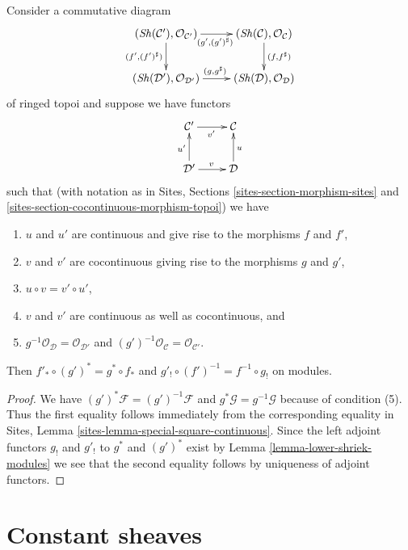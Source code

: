\begin{lemma}
\label{lemma-special-square-continuous}
Consider a commutative diagram
$$
\xymatrix{
(\Sh(\mathcal{C}'), \mathcal{O}_{\mathcal{C}'})
\ar[r]_{(g', (g')^\sharp)} \ar[d]_{(f', (f')^\sharp)} &
(\Sh(\mathcal{C}), \mathcal{O}_\mathcal{C}) \ar[d]^{(f, f^\sharp)} \\
(\Sh(\mathcal{D}'), \mathcal{O}_{\mathcal{D}'}) \ar[r]^{(g, g^\sharp)} &
(\Sh(\mathcal{D}), \mathcal{O}_\mathcal{D})
}
$$
of ringed topoi and suppose we have functors
$$
\xymatrix{
\mathcal{C}' \ar[r]_{v'} &
\mathcal{C} \\
\mathcal{D}' \ar[r]^v \ar[u]^{u'} &
\mathcal{D} \ar[u]_u
}
$$
such that (with notation as in
Sites, Sections \ref{sites-section-morphism-sites} and
\ref{sites-section-cocontinuous-morphism-topoi}) we have
\begin{enumerate}
\item $u$ and $u'$ are continuous and give rise to the morphisms
$f$ and $f'$,
\item $v$ and $v'$ are cocontinuous giving rise to the morphisms $g$ and $g'$,
\item $u \circ v = v' \circ u'$,
\item $v$ and $v'$ are continuous as well as cocontinuous, and
\item $g^{-1}\mathcal{O}_{\mathcal{D}} = \mathcal{O}_{\mathcal{D}'}$
and $(g')^{-1}\mathcal{O}_{\mathcal{C}} = \mathcal{O}_{\mathcal{C}'}$.
\end{enumerate}
Then $f'_* \circ (g')^* = g^* \circ f_*$ and
$g'_! \circ (f')^{-1} = f^{-1} \circ g_!$ on modules.
\end{lemma}

\begin{proof}
We have $(g')^*\mathcal{F} = (g')^{-1}\mathcal{F}$ and
$g^*\mathcal{G} = g^{-1}\mathcal{G}$ because of condition (5).
Thus the first equality follows immediately from the corresponding
equality in Sites, Lemma \ref{sites-lemma-special-square-continuous}.
Since the left adjoint functors $g_!$ and $g'_!$ to $g^*$ and $(g')^*$
exist by Lemma \ref{lemma-lower-shriek-modules}
we see that the second equality follows by
uniqueness of adjoint functors.
\end{proof}







\section{Constant sheaves}
\label{section-constant}

